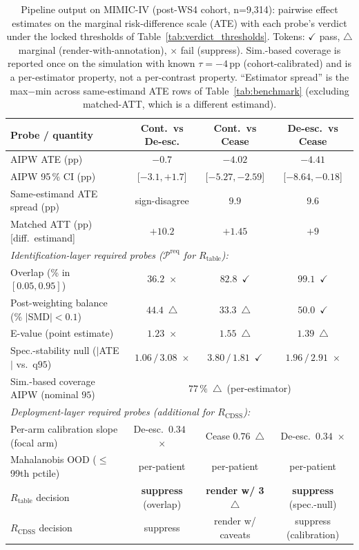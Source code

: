 \documentclass[11pt,a4paper]{article}
\begin{document}
\begin{table}[H]
  \centering
  \footnotesize
  \setlength{\tabcolsep}{4pt}
  \caption{Pipeline output on MIMIC-IV (post-WS4 cohort, n=9{,}314): pairwise effect estimates on the marginal risk-difference scale (ATE) with each probe's verdict under the locked thresholds of Table~\ref{tab:verdict_thresholds}. Tokens: $\checkmark$ pass, $\triangle$ marginal (render-with-annotation), $\times$ fail (suppress). Sim.-based coverage is reported once on the simulation with known $\tau=-4$\,pp (cohort-calibrated) and is a per-estimator property, not a per-contrast property. ``Estimator spread'' is the max$-$min across same-estimand ATE rows of Table~\ref{tab:benchmark} (excluding matched-ATT, which is a different estimand).}
  \label{tab:summary}
  \begin{tabular}{lccc}
    \toprule
    Probe / quantity & Cont.\ vs De-esc. & Cont.\ vs Cease & De-esc.\ vs Cease \\
    \midrule
    AIPW ATE (pp) & $-0.7$ & $-4.02$ & $-4.41$ \\
    AIPW 95\,\% CI (pp) & [$-3.1, +1.7$] & [$-5.27, -2.59$] & [$-8.64, -0.18$] \\
    Same-estimand ATE spread (pp) & sign-disagree & $9.9$ & $9.6$ \\
    Matched ATT (pp) [diff.\ estimand] & $+10.2$ & $+1.45$ & $+9$ \\
    \midrule
    \multicolumn{4}{l}{\emph{Identification-layer required probes ($\mathcal{P}^{\text{req}}$ for $R_{\text{table}}$):}} \\
    Overlap (\% in $[0.05,0.95]$) & $36.2$ \,$\times$ & $82.8$ \,$\checkmark$ & $99.1$ \,$\checkmark$ \\
    Post-weighting balance (\% $|$SMD$|<0.1$) & $44.4$ \,$\triangle$ & $33.3$ \,$\triangle$ & $50.0$ \,$\checkmark$ \\
    E-value (point estimate) & $1.23$ \,$\times$ & $1.55$ \,$\triangle$ & $1.39$ \,$\triangle$ \\
    Spec.-stability null ($|$ATE$|$ vs.\ q$95$) & $1.06\,/\,3.08$ \,$\times$ & $3.80\,/\,1.81$ \,$\checkmark$ & $1.96\,/\,2.91$ \,$\times$ \\
    Sim.-based coverage AIPW (nominal $95$) & \multicolumn{3}{c}{$77\,\%$ \,$\triangle$ \,(per-estimator)} \\
    \midrule
    \multicolumn{4}{l}{\emph{Deployment-layer required probes (additional for $R_{\text{CDSS}}$):}} \\
    Per-arm calibration slope (focal arm) & De-esc.\ $0.34$ \,$\times$ & Cease $0.76$ \,$\triangle$ & De-esc.\ $0.34$ \,$\times$ \\
    Mahalanobis OOD ($\leq$ 99th pctile) & per-patient & per-patient & per-patient \\
    \midrule
    $R_{\text{table}}$ decision & \textbf{suppress} (overlap) & \textbf{render w/ 3$\triangle$} & \textbf{suppress} (spec.-null) \\
    $R_{\text{CDSS}}$ decision & suppress & render w/ caveats & suppress (calibration) \\
    \bottomrule
  \end{tabular}
\end{table}
\end{document}
